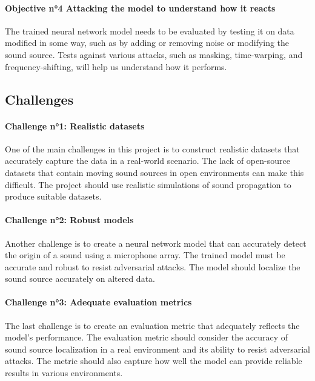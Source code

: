 \paragraph{Objective n°4 Attacking the model to understand how it reacts}

The trained neural network model needs to be evaluated by testing it on data modified in some way, such as by adding or removing noise or modifying the sound source. Tests against various attacks, such as masking, time-warping, and frequency-shifting, will help us understand how it performs.

\subsection{Challenges}
\label{intro:challenges}

\paragraph{Challenge n°1: Realistic datasets}

One of the main challenges in this project is to construct realistic datasets that accurately capture the data in a real-world scenario. The lack of open-source datasets that contain moving sound sources in open environments can make this difficult. The project should use realistic simulations of sound propagation to produce suitable datasets.

\paragraph{Challenge n°2: Robust models}

Another challenge is to create a neural network model that can accurately detect the origin of a sound using a microphone array. The trained model must be accurate and robust to resist adversarial attacks. The model should localize the sound source accurately on altered data.

\paragraph{Challenge n°3: Adequate evaluation metrics}

The last challenge is to create an evaluation metric that adequately reflects the model's performance. The evaluation metric should consider the accuracy of sound source localization in a real environment and its ability to resist adversarial attacks. The metric should also capture how well the model can provide reliable results in various environments.
